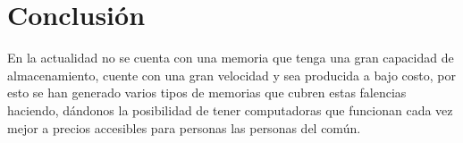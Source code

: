 \documentclass{article}
\begin{document}
\section{Conclusión} \label{Conclusión}

En la actualidad no se cuenta con una memoria que tenga una gran capacidad de almacenamiento, cuente con una gran velocidad y sea producida a bajo costo, por esto se han generado varios tipos de memorias que cubren estas falencias haciendo, dándonos la posibilidad de tener computadoras que funcionan cada vez mejor a precios accesibles para personas las personas del común.   



\end{document}
